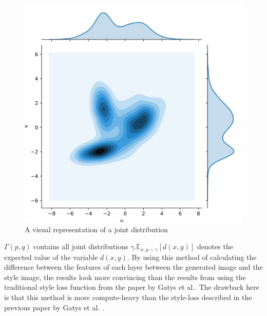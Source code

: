 \begin{figure}[!ht]
\begin{center}
\includegraphics[scale=0.15]{report/Background/images/1024px-Transport-plan.svg.png}
\caption{A visual representation of a joint distribution}
\label{fig:distribution}
\end{center}
\end{figure}$\Gamma(p, q)$ contains all joint distributions $\gamma$.$ \mathbb{E}_{x, y \sim\gamma}[d(x, y)]$ denotes the expected value of the variable $d(x, y)$.
\newline
By using this method of calculating the difference between the features of each layer between the generated image and the style image, the results look more convincing than the results from using the traditional style loss function from the paper by Gatys et al.\cite{Gatys:1}.\newline\newline
The drawback here is that this method is more compute-heavy than the style-loss described in the previous paper by Gatys et al. \cite{Gatys:1}.